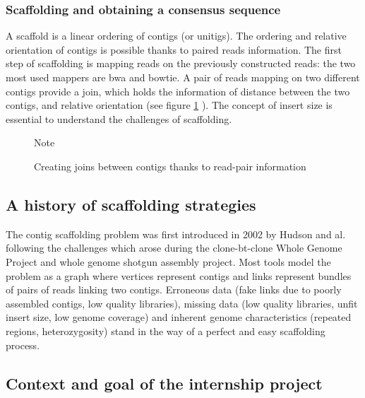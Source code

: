 \documentclass[10pt, twocolumn]{article}
\begin{document}
\subsubsection{Scaffolding and obtaining a consensus sequence}
A scaffold is a linear ordering of contigs (or unitigs). The ordering and relative orientation of contigs is possible thanks to paired reads information. The first step of scaffolding is mapping reads on the previously constructed reads: the two most used mappers are bwa \cite{li_fast_2009} and bowtie\cite{langmead_fast_2012,langmead_ultrafast_2009}. A pair of reads mapping on two different contigs provide a join, which holds the information of distance between the two contigs, and relative orientation (see figure \ref{fig:mappreads} ). The concept of insert size is essential to understand the challenges of scaffolding. 
\begin{figure}[h!]
\caption{Creating joins between contigs thanks to read-pair information}
\label{fig:mappreads}
{\footnotesize Note}
\end{figure}



\subsection{A history of scaffolding strategies}\label{sec:hiscaf}
The contig scaffolding problem was first introduced in 2002 by Hudson and al. \cite{huson_greedy_2002} following the challenges which arose during the clone-bt-clone Whole Genome Project and whole genome shotgun assembly project. 
Most tools model the problem as a graph where vertices represent contigs and links represent bundles of pairs of reads linking two contigs. Erroneous data (fake links due to poorly assembled contigs, low quality libraries), missing data (low quality libraries, unfit insert size, low genome coverage) and inherent genome characteristics (repeated regions,  heterozygosity) stand in the way of a perfect and easy scaffolding process.
\subsection{Context and goal of the internship project}
\end{document}
